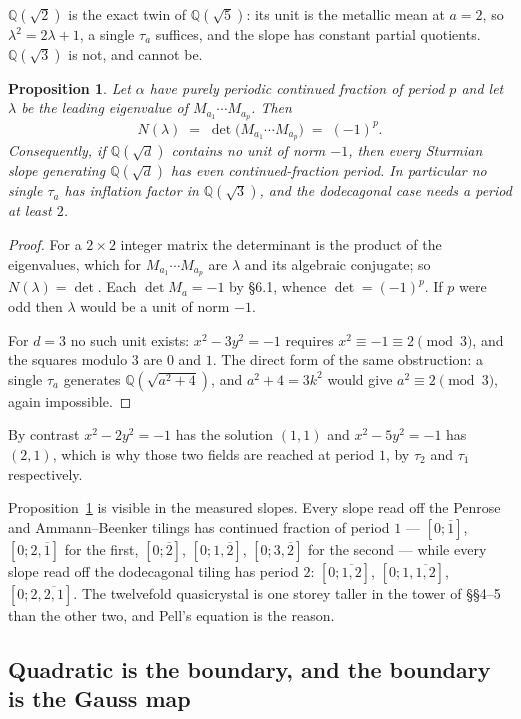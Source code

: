 \documentclass[11pt,a4paper]{article}
\newcommand{\Q}{\mathbb{Q}}
\theoremstyle{definition}
\theoremstyle{plain}
\newtheorem{proposition}[definition]{Proposition}
\begin{document}
$\Q(\sqrt 2)$ is the exact twin of $\Q(\sqrt 5)$: its unit is the metallic mean
at $a = 2$, so $\lambda^2 = 2\lambda + 1$, a single $\tau_a$ suffices, and the
slope has constant partial quotients. $\Q(\sqrt 3)$ is not, and cannot be.

\begin{proposition}\label{prop:norm}
Let $\alpha$ have purely periodic continued fraction of period $p$ and let
$\lambda$ be the leading eigenvalue of $M_{a_1} \cdots M_{a_p}$. Then
\[
  N(\lambda) \;=\; \det\bigl(M_{a_1} \cdots M_{a_p}\bigr) \;=\; (-1)^p .
\]
Consequently, if $\Q(\sqrt d)$ contains no unit of norm $-1$, then every
Sturmian slope generating $\Q(\sqrt d)$ has \emph{even} continued-fraction
period. In particular no single $\tau_a$ has inflation factor in $\Q(\sqrt 3)$,
and the dodecagonal case needs a period at least $2$.
\end{proposition}

\begin{proof}
For a $2 \times 2$ integer matrix the determinant is the product of the
eigenvalues, which for $M_{a_1}\cdots M_{a_p}$ are $\lambda$ and its algebraic
conjugate; so $N(\lambda) = \det$. Each $\det M_{a} = -1$ by \S6.1, whence
$\det = (-1)^p$. If $p$ were odd then $\lambda$ would be a unit of norm $-1$.

For $d = 3$ no such unit exists: $x^2 - 3y^2 = -1$ requires
$x^2 \equiv -1 \equiv 2 \pmod 3$, and the squares modulo $3$ are $0$ and $1$.
The direct form of the same obstruction: a single $\tau_a$ generates
$\Q(\sqrt{a^2+4})$, and $a^2 + 4 = 3k^2$ would give $a^2 \equiv 2 \pmod 3$,
again impossible.
\end{proof}

By contrast $x^2 - 2y^2 = -1$ has the solution $(1,1)$ and $x^2 - 5y^2 = -1$ has
$(2,1)$, which is why those two fields are reached at period $1$, by $\tau_2$ and
$\tau_1$ respectively.

Proposition~\ref{prop:norm} is visible in the measured slopes. Every slope read
off the Penrose and Ammann--Beenker tilings has continued fraction of period
$1$ --- $[0;\overline{1}]$, $[0;2,\overline{1}]$ for the first,
$[0;\overline{2}]$, $[0;1,\overline{2}]$, $[0;3,\overline{2}]$ for the second
--- while every slope read off the dodecagonal tiling has period $2$:
$[0;\overline{1,2}]$, $[0;1,\overline{1,2}]$, $[0;2,\overline{2,1}]$. The
twelvefold quasicrystal is one storey taller in the tower of \S\S4--5 than the
other two, and Pell's equation is the reason.

\subsection{Quadratic is the boundary, and the boundary is the Gauss map}
\end{document}
